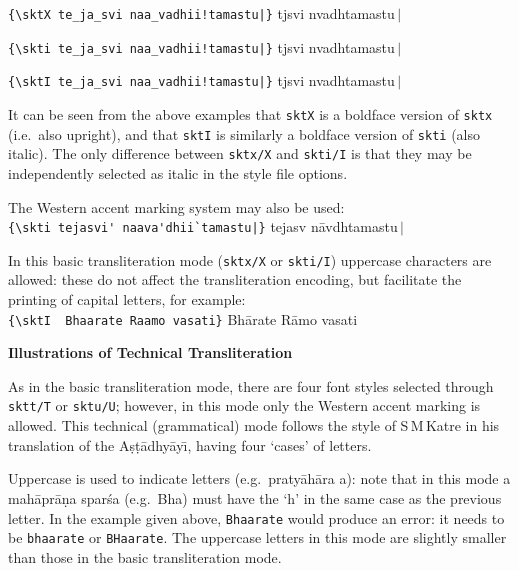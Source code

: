 \documentclass[12pt]{article}
\begin{document}
\verb+{\+\verb+sktX te_ja_svi naa_vadhii!tamastu|}+\hspace{.8mm}
             {\sktX tjsvi nvadhtamastu{\upshape\boldmath\,$\mid$}}

\verb+{\+\verb+skti te_ja_svi naa_vadhii!tamastu|}+\hspace{.8mm}
             {\skti tjsvi nvadhtamastu{\upshape\,$\mid$}}

\verb+{\+\verb+sktI te_ja_svi naa_vadhii!tamastu|}+\hspace{.8mm}
             {\sktI tjsvi nvadhtamastu{\upshape\boldmath\,$\mid$}}

It can be seen from the above examples that \verb+sktX+ is a boldface
version of \verb+sktx+ (i.e.~also upright), and that \verb+sktI+ is
similarly a boldface version of \verb+skti+ (also italic).
The only difference between \verb+sktx/X+ and \verb+skti/I+ is that
they may be independently selected as italic in the style file options.

\pagebreak

The Western accent marking system may also be used:\\[2mm]
\verb+{\+\verb+skti tejasvi' naava'dhii`tamastu|}+\hspace{.8mm}
             {\skti tejasv n\=avdhtamastu{\upshape\,$\mid$}}

In this basic transliteration mode (\verb+sktx/X+ or \verb+skti/I+) uppercase 
characters are allowed: these do not affect the transliteration encoding, 
but facilitate the printing of capital letters, for example:\\[2mm]
\verb+{\+\verb+sktI  Bhaarate Raamo vasati}+\hspace{5mm}
                   {\sktI  Bh\=arate R\=amo vasati}
\vspace{4mm}

{\large\bf Illustrations of Technical Transliteration\par}

As in the basic transliteration mode, there are four font styles selected
through \verb+sktt/T+ or \verb+sktu/U+; however, in this mode only the
Western accent marking is allowed. This technical (grammatical) mode
follows the style of S\,M\,Katre in his translation of the 
{\skti A\d s\d t\=adhy\=ay\={\i}}, having four `cases' of letters.

Uppercase is used to indicate {\sktT {}\/} letters 
(e.g.~{\skti praty\=ah\=ara\/} {\sktT a\/}): note that in this mode
a {\skti mah\=apr\=a\d na spar\'sa\/} (e.g.~{\skti Bha\/}) must have the 
`{\skti h\/}' in the same case as the previous letter. In the example 
given above, \verb+Bhaarate+ would produce an error: it needs to be 
\verb+bhaarate+ or \verb+BHaarate+. The uppercase letters in this mode 
are slightly smaller than those in the basic transliteration mode.
\end{document}
